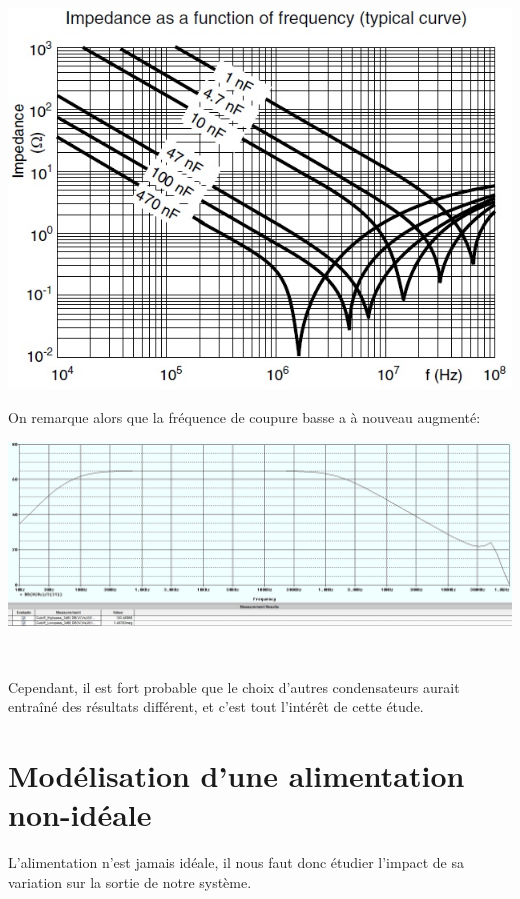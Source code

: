 \documentclass{article}
\begin{document}
\includegraphics[width=\linewidth]{courbes_condo.jpg}


On remarque alors que la fréquence de coupure basse a à nouveau augmenté:

\includegraphics[width=\linewidth]{bode_LSR.jpg}


~

Cependant, il est fort probable que le choix d’autres condensateurs aurait entraîné des résultats différent, et c’est tout l’intérêt de cette étude.

\section{Modélisation d’une alimentation non-idéale}

L’alimentation n’est jamais idéale, il nous faut donc étudier l’impact de sa variation sur la sortie de notre système.
\end{document}
